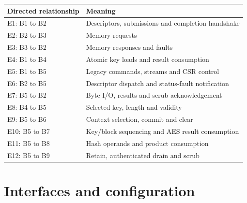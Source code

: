 \documentclass[11pt,a4paper]{article}
\begin{document}
{\small\renewcommand{\arraystretch}{1.18}\begin{longtable}{@{}L{0.24\textwidth}|L{0.7\textwidth}@{}}\toprule

\textbf{Directed relationship} & \textbf{Meaning}\\\midrule\endhead

E1: B1 to B2 & Descriptors,\allowbreak{} submissions and completion handshake\\[2pt]\hline

E2: B2 to B3 & Memory requests\\[2pt]\hline

E3: B3 to B2 & Memory responses and faults\\[2pt]\hline

E4: B1 to B4 & Atomic key loads and result consumption\\[2pt]\hline

E5: B1 to B5 & Legacy commands,\allowbreak{} streams and CSR control\\[2pt]\hline

E6: B2 to B5 & Descriptor dispatch and status-fault notification\\[2pt]\hline

E7: B5 to B2 & Byte I/\allowbreak{}O,\allowbreak{} results and scrub acknowledgement\\[2pt]\hline

E8: B4 to B5 & Selected key,\allowbreak{} length and validity\\[2pt]\hline

E9: B5 to B6 & Context selection,\allowbreak{} commit and clear\\[2pt]\hline

E10: B5 to B7 & Key/\allowbreak{}block sequencing and AES result consumption\\[2pt]\hline

E11: B5 to B8 & Hash operands and product consumption\\[2pt]\hline

E12: B5 to B9 & Retain,\allowbreak{} authenticated drain and scrub\\[2pt]\hline

\bottomrule\end{longtable}}

\section{Interfaces and configuration}
\end{document}

